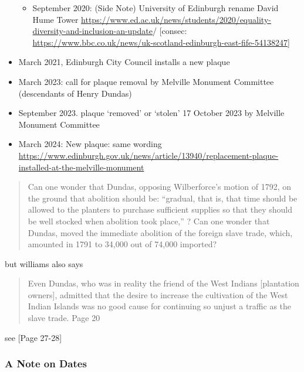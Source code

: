 \documentclass{scrartcl}
\begin{document}
\begin{itemize}
\begin{itemize}
    \end{itemize}
    \begin{itemize}
        \item September 2020: (Side Note) University of Edinburgh rename David Hume Tower \url{https://www.ed.ac.uk/news/students/2020/equality-diversity-and-inclusion-an-update}/ [consec: \url{https://www.bbc.co.uk/news/uk-scotland-edinburgh-east-fife-54138247}]
    \end{itemize}
    \item March 2021, Edinburgh City Council  installs a new plaque  \cite{mccarthy_2022}\cite{anderson_2021}
    \item March 2023: call for plaque removal by Melville Monument Committee (descendants of Henry Dundas)  \cite{bbc_2023}
    \item September 2023. plaque `removed' or `stolen' 17 October 2023  by Melville Monument Committee \cite{bbc_2024}
    \item March 2024: New plaque: same wording \cite{bbc_2024} \url{https://www.edinburgh.gov.uk/news/article/13940/replacement-plaque-installed-at-the-melville-monument}
\end{itemize}

\begin{quotation}
    Can one wonder that Dundas, 
            opposing Wilberforce’s motion of 1792, 
                    on the ground that abolition should be: 
                    “gradual, that is, that time should be allowed to the planters to purchase sufficient supplies so that they should be well stocked when abolition took place,'' ?
    Can one wonder that Dundas, 
    moved the immediate abolition of the foreign slave trade, 
     which, 
    amounted in 1791 to 34,000 out of 74,000 imported?
\end{quotation}
\cite{williams_1938}

but williams also says

\begin{quotation}
    Even Dundas, who was in reality the friend of the West Indians [plantation owners], admitted that the desire to increase the cultivation of the West Indian Islands was no good cause for continuing so unjust a traffic as the slave trade. Page 20
\end{quotation} 
see \cite{williams_1938}[Page 27-28]

\subsubsection{A Note on Dates}
\end{document}
